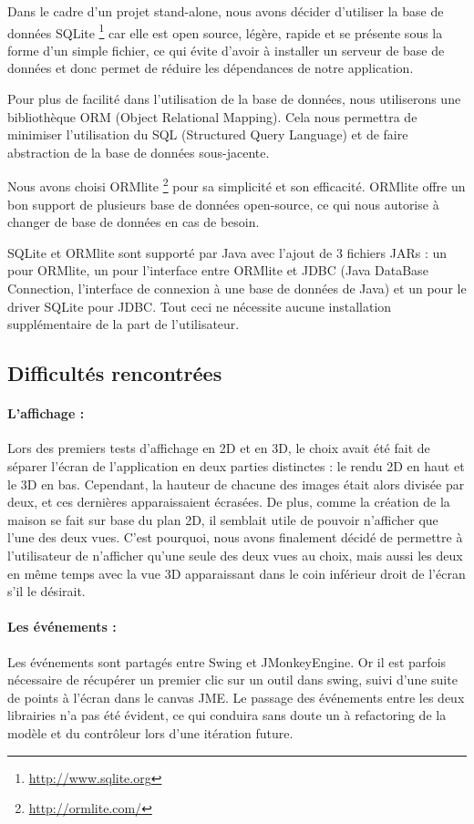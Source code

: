 \documentclass[a4paper, 12pt]{report}
\begin{document}
Dans le cadre d'un projet stand-alone, nous avons décider d'utiliser la base de données SQLite \footnote{\url{http://www.sqlite.org}} car elle est open source, légère, rapide et se présente sous la forme d'un simple fichier, ce qui évite d'avoir à installer un serveur de base de données et donc permet de réduire les dépendances de notre application.

Pour plus de facilité dans l'utilisation de la base de données, nous utiliserons une bibliothèque ORM (Object Relational Mapping). Cela nous permettra de minimiser l'utilisation du SQL (Structured Query Language) et de faire abstraction de la base de données sous-jacente.

Nous avons choisi ORMlite \footnote{\url{http://ormlite.com/}} pour sa simplicité et son efficacité. ORMlite offre un bon support de plusieurs base de données open-source, ce qui nous autorise à changer de base de données en cas de besoin.

SQLite et ORMlite sont supporté par Java avec l'ajout de 3 fichiers JARs : un pour ORMlite, un pour l'interface entre ORMlite et JDBC (Java DataBase Connection, l'interface de connexion à une base de données de Java) et un pour le driver SQLite pour JDBC. Tout ceci ne nécessite aucune installation supplémentaire de la part de l'utilisateur.

			\subsection{Difficultés rencontrées}
				\paragraph{L'affichage :} Lors des premiers tests d'affichage en 2D et en 3D, le choix avait été fait de séparer l'écran de l'application en deux parties distinctes : le rendu 2D en haut et le 3D en bas. Cependant, la hauteur de chacune des images était alors divisée par deux, et ces dernières apparaissaient écrasées. De plus, comme la création de la maison se fait sur base du plan 2D, il semblait utile de pouvoir n'afficher que l'une des deux vues. C'est pourquoi, nous avons finalement décidé de permettre à l'utilisateur de n'afficher qu'une seule des deux vues au choix, mais aussi les deux en même temps avec la vue 3D apparaissant dans le coin inférieur droit de l'écran s'il le désirait.
				
				\paragraph{Les événements :} Les événements sont partagés entre Swing et JMonkeyEngine. Or il est parfois nécessaire de récupérer un premier clic sur un outil dans swing, suivi d'une suite de points à l'écran dans le canvas JME. Le passage des événements entre les deux librairies n'a pas été évident, ce qui conduira sans doute un à refactoring de la modèle et du contrôleur lors d'une itération future.
				
\end{document}
